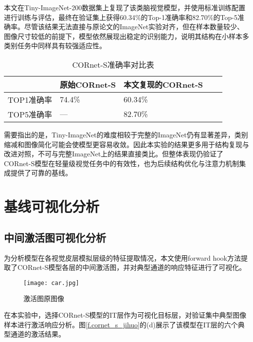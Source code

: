 本文在Tiny-ImageNet-200数据集上复现了该类脑视觉模型，并使用标准训练配置进行训练与评估，最终在验证集上获得60.34\%的Top-1准确率和82.70\%的Top-5准确率。尽管该结果无法直接与原论文的ImageNet实验对齐，但在样本数量较少、图像尺寸较低的前提下，模型依然展现出稳定的识别能力，说明其结构在小样本多类别任务中同样具有较强适应性。

\begin{table}[htb]
	\centering
	\caption{CORnet-S准确率对比表}
	\label{tab:CORnet-S}
	\begin{tabular}{lllll}
		\hline
		       & 原始CORnet-S & 本文复现的CORnet-S \\
		\hline
		TOP1准确率 & 74.4\% & 60.34\%   \\
		TOP5准确率 & — & 82.70\%    \\
		\hline
	\end{tabular}
\end{table}

需要指出的是，Tiny-ImageNet的难度相较于完整的ImageNet仍有显著差异，类别缩减和图像简化可能会使模型更容易收敛。因此本实验的结果更多用于结构复现与改进对照，不可与完整ImageNet上的结果直接类比。但整体表现仍验证了CORnet-S模型在轻量级视觉任务中的有效性，也为后续结构优化与注意力机制集成提供了可靠的基线。

\section{基线可视化分析}

\subsection{中间激活图可视化分析}

为分析模型在各视觉皮层模拟层级的特征提取情况，本文使用forward hook方法提取了CORnet-S模型各层的中间激活图，并对典型通道的响应特征进行了可视化。

\begin{figure}[hbt]
	\centering
	\texttt{[image: car.jpg]}
	\caption{激活图原图像}
	\label{f.car}
\end{figure}


在本实验中，选择CORnet-S模型的IT层作为可视化目标层，对验证集中典型图像样本进行激活响应分析。图\ref{f.cornet_s_jihuo}的(d)展示了该模型在IT层的六个典型通道的激活结果。

